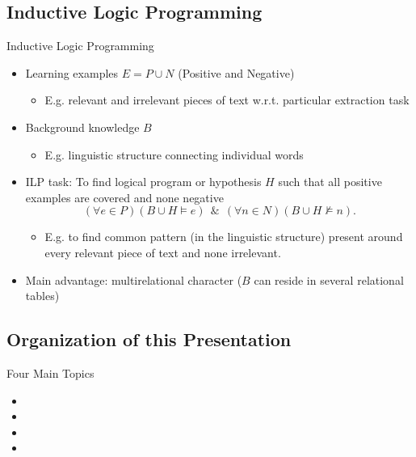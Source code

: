 \documentclass[xcolor=dvipsnames]{beamer}
\begin{document}
\subsection{Inductive Logic Programming} 

\begin{frame}{Inductive Logic Programming}
\begin{itemize}
	\item Learning examples $E=P\cup N$ (Positive and Negative)	
	\begin{itemize}
		\item E.g. relevant and irrelevant pieces of text w.r.t. particular extraction task
	\end{itemize}	
	\item Background knowledge $B$
	\begin{itemize}
		\item E.g. linguistic structure connecting individual words
	\end{itemize}	
	\item ILP task: To find logical program or hypothesis $H$ such that all positive examples are covered and none negative
$$
(\forall e\in P)(B\cup H\models e) \ \ \&\  \ (\forall n\in N)(B\cup H\not\models n).
$$
	\begin{itemize}
		\item E.g. to find common pattern (in the linguistic structure) present around every relevant piece of text and none irrelevant.
	\end{itemize}
	
	\bigskip
	\item Main advantage: multirelational character ($B$ can reside in several relational tables)
\end{itemize}
\end{frame}


\subsection{Organization of this Presentation} 

\begin{frame}{Four Main Topics}

\begin{itemize}
	\item {}
	\item {}
	\item {}
	\item {}
\end{itemize}

\end{frame}
\end{document}
